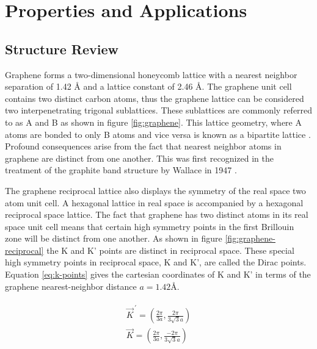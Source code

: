 \section{Properties and Applications}
  \subsection{Structure Review}
Graphene forms a two-dimensional honeycomb lattice with a nearest neighbor separation of 1.42 {\AA} and a lattice constant of 2.46 {\AA}. The graphene unit cell contains two distinct carbon atoms, thus the graphene lattice can be considered two interpenetrating trigonal sublattices. These sublattices are commonly referred to as A and B as shown in figure \ref{fig:graphene}. This lattice geometry, where A atoms are bonded to only B atoms and vice versa is known as a bipartite lattice \cite{katsnelson}. Profound consequences arise from the fact that nearest neighbor atoms in graphene are distinct from one another. This was first recognized in the treatment of the graphite band structure by Wallace in 1947 \cite{wallace}.

The graphene reciprocal lattice also displays the symmetry of the real space two atom unit cell. A hexagonal lattice in real space is accompanied by a hexagonal reciprocal space lattice. The fact that graphene has two distinct atoms in its real space unit cell means that certain high symmetry points in the first Brillouin zone will be distinct from one another. As shown in figure \ref{fig:graphene-reciprocal} the K and K' points are distinct in reciprocal space. These special high symmetry points in reciprocal space, K and K', are called the Dirac points. Equation \ref{eq:k-points} gives the cartesian coordinates of K and K' in terms of the graphene nearest-neighbor distance $a =  1.42${\AA}.

\begin{align}
\label{eq:k-points}
\begin{split}
\vec{K}^{\, '} = ( \frac{2\pi}{3a}, \frac{2\pi}{3 \sqrt{3} a} ) \\   \vec{K} = ( \frac{2\pi}{3a}, \frac{-2\pi}{3 \sqrt{3} a} )
\end{split}
\end{align}

